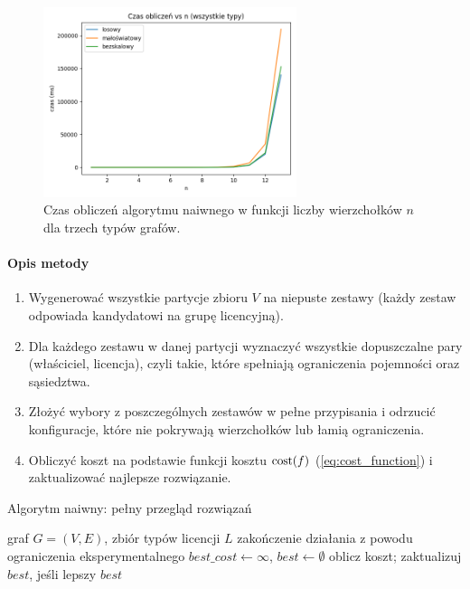 \begin{figure}[H]
  \centering
  \includegraphics[width=0.66\textwidth]{assets/all_types_plot.png}
  \caption{Czas obliczeń algorytmu naiwnego w funkcji liczby wierzchołków $n$ dla trzech typów grafów.}
  \label{fig:all_types_time}
\end{figure}

\paragraph{Opis metody}
\begin{enumerate}
  \item Wygenerować wszystkie partycje zbioru \(V\) na niepuste zestawy (każdy zestaw odpowiada kandydatowi na grupę licencyjną).
  \item Dla każdego zestawu w danej partycji wyznaczyć wszystkie dopuszczalne pary (właściciel, licencja), czyli takie, które spełniają ograniczenia pojemności oraz sąsiedztwa.
  \item Złożyć wybory z poszczególnych zestawów w pełne przypisania i odrzucić konfiguracje, które nie pokrywają wierzchołków lub łamią ograniczenia.
  \item Obliczyć koszt na podstawie funkcji kosztu $\operatorname{cost}(f)$ (\ref{eq:cost_function}) i zaktualizować najlepsze rozwiązanie.
\end{enumerate}

\begin{algorithm}[H]
  \caption{Algorytm naiwny: pełny przegląd rozwiązań}
  \label{alg:naive}
  \begin{algorithmic}[1]
    \Require graf \(G=(V,E)\), zbiór typów licencji \(L\)
     \State \Return zakończenie działania z powodu ograniczenia eksperymentalnego \EndIf
    \State \(best\_cost \gets \infty\), \(best \gets \emptyset\)
    \State oblicz koszt; zaktualizuj \(best\), jeśli lepszy
    \EndIf
    \EndFor
    \EndFor
    \State \Return \(best\)
  \end{algorithmic}
\end{algorithm}

